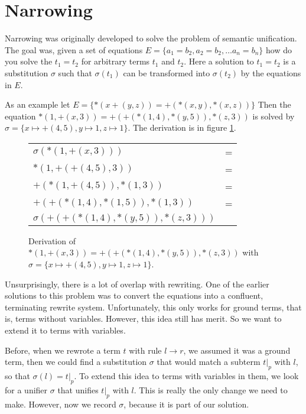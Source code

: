 \documentclass{book}
\theoremstyle{definition}
\begin{document}
\section{Narrowing}

Narrowing was originally developed to solve the problem of semantic unification.
The goal was, given a set of equations $E = \{a_1 = b_2, a_2 = b_2, \ldots a_n = b_n\}$ 
how do you solve the $t_1 = t_2$ for arbitrary terms $t_1$ and $t_2$.
Here a solution to $t_1 = t_2$ is a substitution $\sigma$ such that $\sigma(t_1)$
can be transformed into $\sigma(t_2)$ by the equations in $E$.

As an example let $E = \{*(x +(y, z)) = +(*(x,y), *(x,z))\}$
Then the equation $*(1,+(x,3)) = +(+(*(1,4), *(y,5)), *(z,3))$
is solved by $\sigma = \{x \mapsto +(4,5), y \mapsto 1, z \mapsto 1\}$.
The derivation is in figure \ref{fig:narrow}.

\begin{figure}[h]
\begin{tabular}{ll}
    $\sigma(*(1,+(x,3)))$                & = \\
    $*(1,+(+(4,5),3))$                   & = \\
    $+(*(1,+(4,5)),*(1,3))$              & = \\
    $+(+(*(1,4),*(1,5)),*(1,3))$         & = \\
    $\sigma(+(+(*(1,4),*(y,5)),*(z,3)))$ &
\end{tabular}
    \caption{Derivation of $*(1,+(x,3)) = +(+(*(1,4), *(y,5)), *(z,3))$ with
    $\sigma = \{x \mapsto +(4,5), y \mapsto 1, z \mapsto 1\}$.}
    \label{fig:narrow}
\end{figure}

Unsurprisingly, there is a lot of overlap with rewriting.
One of the earlier solutions to this problem was to convert 
the equations into a confluent, terminating rewrite system. \cite{KnuthBendix}
Unfortunately, this only works for ground terms, that is, terms without variables.
However, this idea still has merit.
So we want to extend it to terms with variables.

Before, when we rewrote a term $t$ with rule $l \to r$, we assumed it was a ground term,
then we could find a substitution $\sigma$ that would match a subterm $t\vert_p$ with $l$,
so that $\sigma(l) = t\vert_p$.
To extend this idea to terms with variables in them, 
we look for a unifier $\sigma$ that unifies $t\vert_p$ with $l$.
This is really the only change we need to make.
However, now we record $\sigma$, because it is part of our solution.
\end{document}
